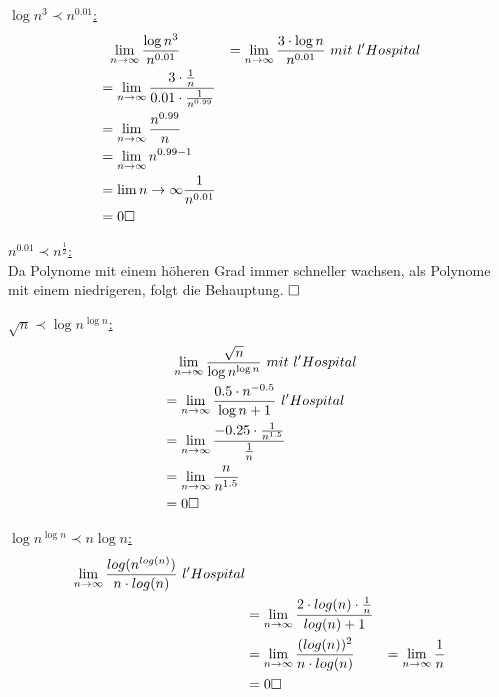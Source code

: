 \documentclass{article}
\begin{document}
\begin{enumerate}
\underline{$\log n^3 \prec n^{0.01}$:} \\
\begin{align*}
&~~    \lim_{n \to \infty} \frac{\log n^3}{n^{0.01}} &= \lim_{n \to \infty}
        \frac{3 \cdot \log n}{n^{0.01}} ~mit~l 'Hospital\\
        &= \lim_{n \to \infty} \frac{3 \cdot \frac{1}{n}}{0.01 \cdot \frac{1}{n^{0.99}}} \\
        &= \lim_{n \to \infty} \frac{n^{0.99}}{n} \\
	&= \lim_{n \to \infty} n^{0.99-1} \\
	&= \lim {n \to \infty} \frac{1}{n^{0.01}} \\
	&= 0 \hfill \square
\end{align*}

\underline{$n^{0.01} \prec n^{\frac{1}{2}}$:} \\
Da Polynome mit einem höheren Grad immer schneller wachsen, als
Polynome mit einem niedrigeren, folgt die Behauptung. $\hfill \square$

\underline{$\sqrt{n} \prec \log n^{\log n}$:} \\
\begin{align*}
&~~\lim_{n \to \infty} \frac{\sqrt{n}}{\log n^{ \log n}} ~mit~l'Hospital\\
	&= \lim_{n \to \infty} \frac{0.5 \cdot n^{-0.5}}{\log n +1} ~l 'Hospital\\
        &= \lim_{n \to \infty} \frac{-0.25 \cdot \frac{1}{n^{1.5}}}{\frac{1}{n}}  \\
	&= \lim_{n \to \infty} \frac{n}{n^{1.5}} \\
        &= 0 \hfill \square
\end{align*}


\underline{$\log n^{\log n} \prec n \log n$:} \\
\begin{align*}
\lim_{n \to \infty} \frac{log (n^{log (n)})}{n \cdot log (n)} ~l'Hospital\\    
	&=\lim_{n \to \infty} \frac{2 \cdot log(n) \cdot \frac{1}{n}}{log(n)+1} \\
	&=\lim_{n \to \infty} \frac{(log(n))^2}{n \cdot log(n)}
	&=\lim_{n \to \infty} \frac{1}{n} \\
	&= 0 \hfill \square
\end{align*}



\end{enumerate}
\end{document}
